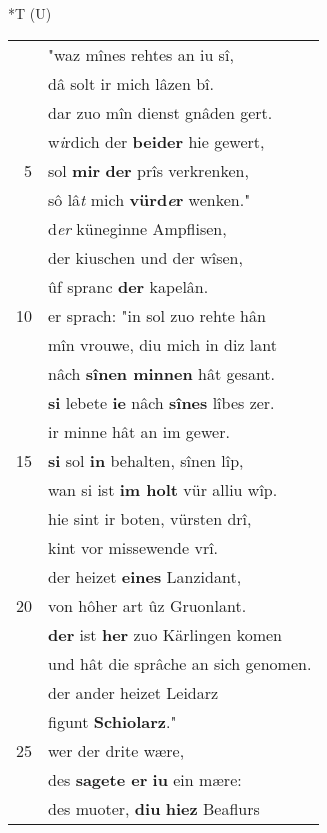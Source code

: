 \documentclass[8pt,a4paper,notitlepage]{article}
\begin{document}
\begin{table}[ht]
\begin{minipage}[t]{0.5\linewidth}
\end{minipage}
\hspace{0.5cm}
\begin{minipage}[t]{0.5\linewidth}
\small
\begin{center}*T (U)
\end{center}
\begin{tabular}{rl}
 & "waz mînes rehtes an iu sî,\\ 
 & dâ solt ir mich lâzen bî.\\ 
 & dar zuo mîn dienst gnâden gert.\\ 
 & w\textit{i}rdich der \textbf{beider} hie gewert,\\ 
5 & sol \textbf{mir} \textbf{der} prîs verkrenken,\\ 
 & sô lâ\textit{t} mich \textbf{vürd\textit{e}r} wenken."\\ 
 & d\textit{er} küneginne Ampflisen,\\ 
 & der kiuschen und der wîsen,\\ 
 & ûf spranc \textbf{der} kapelân.\\ 
10 & er sprach: "in sol zuo rehte hân\\ 
 & mîn vrouwe, diu mich in diz lant\\ 
 & nâch \textbf{sînen minnen} hât gesant.\\ 
 & \textbf{si} lebete \textbf{ie} nâch \textbf{sînes} lîbes zer.\\ 
 & ir minne hât an im gewer.\\ 
15 & \textbf{si} sol \textbf{in} behalten, sînen lîp,\\ 
 & wan si ist \textbf{im holt} vür alliu wîp.\\ 
 & hie sint ir boten, vürsten drî,\\ 
 & kint vor missewende vrî.\\ 
 & der heizet \textbf{eines} Lanzidant,\\ 
20 & von hôher art ûz Gruonlant.\\ 
 & \textbf{der} ist \textbf{her} zuo Kärlingen komen\\ 
 & und hât die sprâche an sich genomen.\\ 
 & der ander heizet Leidarz\\ 
 & figunt \textbf{Schiolarz}."\\ 
25 & wer der drite wære,\\ 
 & des \textbf{sagete er} \textbf{iu} ein mære:\\ 
 & des muoter, \textbf{diu} \textbf{hiez} Beaflurs\\ 

\end{tabular}
\end{minipage}
\end{table}
\end{document}
